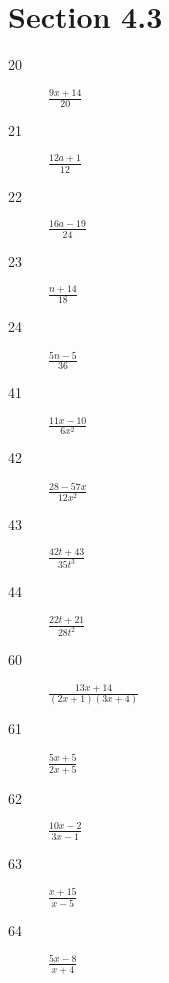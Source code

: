 \documentclass[letterpaper, landscape]{exam}
\begin{document}
  \ifprintanswers{}

    \newpage

    \section{Section 4.3} %
    
    \begin{description}
      \item[20] $\frac{9x + 14}{20}$

      \item[21] $\frac{12a + 1}{12}$

      \item[22] $\frac{16a - 19}{24}$

      \item[23] $\frac{n + 14}{18}$

      \item[24] $\frac{5n-5}{36}$

      \item[41] $\frac{11x - 10}{6x^2}$

      \item[42] $\frac{28 - 57x}{12x^2}$

      \item[43] $\frac{42t + 43}{35t^3}$

      \item[44] $\frac{22t + 21}{28t^2}$






      \item[60] $\frac{13x + 14}{(2x + 1)(3x + 4)}$

      \item[61] $\frac{5x + 5}{2x + 5}$

      \item[62] $\frac{10x - 2}{3x - 1}$

      \item[63] $\frac{x + 15}{x - 5}$

      \item[64] $\frac{5x - 8}{x + 4}$

    \end{description}
\end{document}
